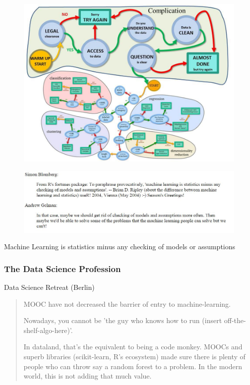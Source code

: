 \documentclass[MASTER.tex]{subfiles}
\begin{document}
\begin{frame}
	\begin{figure}
		\centering
		\includegraphics[width=0.9\linewidth]{SKLCheatSheet2}
		
	\end{figure}
\end{frame}
\begin{frame}
	\begin{figure}
\centering
\includegraphics[width=1.1\linewidth]{machinelearningquotes}
\end{figure}
\Large Machine Learning is statistics minus any checking of models or assumptions
\end{frame}
\begin{frame}
	\frametitle{The Data Science Profession}
	Data Science Retreat (Berlin)
	\begin{quote}
		MOOC have not  decreased the barrier of entry to machine-learning.
		
		
		Nowadays, you cannot be 'the guy who knows how to run (insert off-the-shelf-algo-here)'. 
		
		
		In dataland, that's the equivalent to being a code monkey. MOOCs and superb libraries (scikit-learn, R's ecosystem) made 
		sure there is plenty of people who can throw say a random forest to a problem. In the modern world, this is not adding that much value. 
	\end{quote}
\end{frame}
\end{document}
